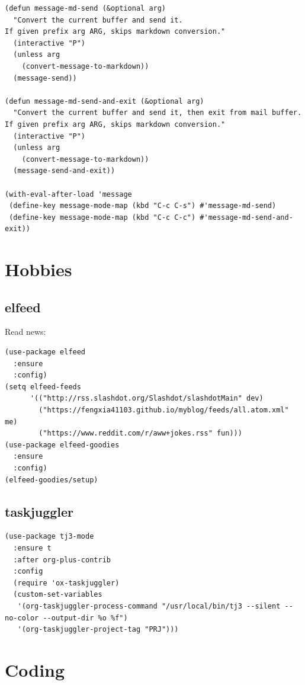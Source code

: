 \documentclass[11pt]{article}
\begin{document}
\begin{enumerate}
\begin{verbatim}
(defun message-md-send (&optional arg)
  "Convert the current buffer and send it.
If given prefix arg ARG, skips markdown conversion."
  (interactive "P")
  (unless arg
    (convert-message-to-markdown))
  (message-send))

(defun message-md-send-and-exit (&optional arg)
  "Convert the current buffer and send it, then exit from mail buffer.
If given prefix arg ARG, skips markdown conversion."
  (interactive "P")
  (unless arg
    (convert-message-to-markdown))
  (message-send-and-exit))

(with-eval-after-load 'message
 (define-key message-mode-map (kbd "C-c C-s") #'message-md-send)
 (define-key message-mode-map (kbd "C-c C-c") #'message-md-send-and-exit))
\end{verbatim}
\end{enumerate}
\section{Hobbies}
\label{sec:org2a75643}
\subsection{elfeed}
\label{sec:org5085744}

Read news:
\begin{verbatim}
(use-package elfeed
  :ensure
  :config)
(setq elfeed-feeds
      '(("http://rss.slashdot.org/Slashdot/slashdotMain" dev)
        ("https://fengxia41103.github.io/myblog/feeds/all.atom.xml" me)
        ("https://www.reddit.com/r/aww+jokes.rss" fun)))
(use-package elfeed-goodies
  :ensure
  :config)
(elfeed-goodies/setup)
\end{verbatim}

\subsection{taskjuggler}
\label{sec:org26753eb}
\begin{verbatim}
(use-package tj3-mode
  :ensure t
  :after org-plus-contrib
  :config
  (require 'ox-taskjuggler)
  (custom-set-variables
   '(org-taskjuggler-process-command "/usr/local/bin/tj3 --silent --no-color --output-dir %o %f")
   '(org-taskjuggler-project-tag "PRJ")))
\end{verbatim}

\section{Coding}
\label{sec:orgd91c51a}
\end{document}
